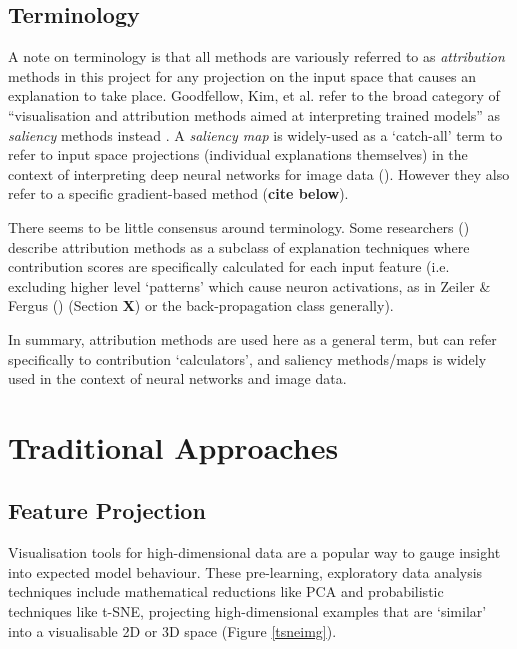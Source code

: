 \documentclass[main]{subfiles}
\begin{document}
\subsection*{Terminology}
A note on terminology is that all methods are variously referred to as \textit{attribution} methods in this project for any projection on the input space that causes an explanation to take place. Goodfellow, Kim, et al. refer to the broad category of ``visualisation and attribution methods aimed at interpreting trained models'' as \textit{saliency} methods instead \cite{sanity}. A \textit{saliency map} is widely-used as a `catch-all' term to refer to input space projections (individual explanations themselves) in the context of interpreting deep neural networks for image data (\cite{sanity}). However they also refer to a specific gradient-based method (\textbf{cite below}). 

There seems to be little consensus around terminology. Some researchers (\cite{patternnet}) describe attribution methods as a subclass of explanation techniques where contribution scores are specifically calculated for each input feature (i.e. excluding higher level `patterns' which cause  neuron activations, as in Zeiler \& Fergus (\cite{zeilerfergus2013}) (Section \textbf{X}) or the back-propagation class generally). 

In summary, attribution methods are used here as a general term, but can refer specifically to contribution `calculators', and saliency methods/maps is widely used in the context of neural networks and image data.

\section{Traditional Approaches}

\subsection{Feature Projection}
Visualisation tools for high-dimensional data are a popular way to gauge insight into expected model behaviour.  These pre-learning, exploratory data analysis techniques include mathematical reductions like PCA and probabilistic techniques like t-SNE,  projecting high-dimensional examples that are `similar' into a visualisable 2D or 3D space \cite{tsnepaper} (Figure \ref{tsneimg}).
\end{document}
